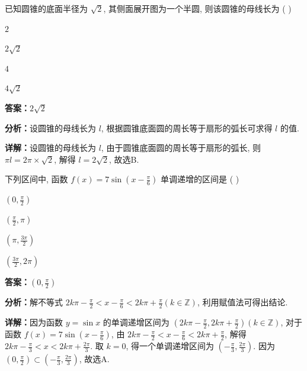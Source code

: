 \begin{question}[points=5]
已知圆锥的底面半径为 $\sqrt{2}$, 其侧面展开图为一个半圆, 则该圆锥的母线长为 ( )
\begin{choices}
  \item $2$
  \item $2\sqrt{2}$
  \item $4$
  \item $4\sqrt{2}$
\end{choices}
\begin{solution}
\textbf{答案：}$2\sqrt{2}$

\textbf{分析：}设圆锥的母线长为 $l$, 根据圆锥底面圆的周长等于扇形的弧长可求得 $l$ 的值.

\textbf{详解：}设圆锥的母线长为 $l$, 由于圆锥底面圆的周长等于扇形的弧长, 则 $\pi l = 2\pi \times \sqrt{2}$, 解得 $l = 2\sqrt{2}$, 故选B.
\end{solution}
\end{question}

\begin{question}[points=5]
下列区间中, 函数 $f(x) = 7\sin\left(x - \frac{\pi}{6}\right)$ 单调递增的区间是 ( )
\begin{choices}
  \item $\left(0, \frac{\pi}{2}\right)$
  \item $\left(\frac{\pi}{2}, \pi\right)$
  \item $\left(\pi, \frac{3\pi}{2}\right)$
  \item $\left(\frac{3\pi}{2}, 2\pi\right)$
\end{choices}
\begin{solution}
\textbf{答案：}$\left(0, \frac{\pi}{2}\right)$

\textbf{分析：}解不等式 $2k\pi - \frac{\pi}{2} < x - \frac{\pi}{6} < 2k\pi + \frac{\pi}{2} (k \in \mathbb{Z})$, 利用赋值法可得出结论.

\textbf{详解：}因为函数 $y = \sin x$ 的单调递增区间为 $\left(2k\pi - \frac{\pi}{2}, 2k\pi + \frac{\pi}{2}\right) (k \in \mathbb{Z})$, 对于函数 $f(x) = 7\sin\left(x - \frac{\pi}{6}\right)$, 由 $2k\pi - \frac{\pi}{2} < x - \frac{\pi}{6} < 2k\pi + \frac{\pi}{2}$, 解得 $2k\pi - \frac{\pi}{3} < x < 2k\pi + \frac{2\pi}{3}$. 取 $k=0$, 得一个单调递增区间为 $\left(-\frac{\pi}{3}, \frac{2\pi}{3}\right)$. 因为 $\left(0, \frac{\pi}{2}\right) \subset \left(-\frac{\pi}{3}, \frac{2\pi}{3}\right)$, 故选A.
\end{solution}
\end{question}

